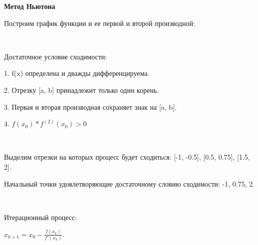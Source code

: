 \documentclass[]{article}
\begin{document}
\newpage
\begin{center}
	\huge\textbf{Метод Ньютона}
\end{center}

Построим график функции и ее первой и второй производной:

\begin{center}
\end{center}


~

Достаточное условие сходимости:

1. f(x) определена и дважды дифференцируема.

2. Отрезку [a, b] принадлежит только один корень.

3. Первая и вторая производная сохраняет знак на [a, b].

4. $f(x_0)*f^{(2)}(x_0) > 0$

~

Выделим отрезки на которых процесс будет сходиться: [-1, -0.5], [0.5, 0.75], [1.5, 2].

Начальный точки удовлетворяющие достаточному словию сходимости: -1, 0.75, 2.

~

Итерационный процесс:

$x_{k+1} = x_{0} - \frac{f(x_{k})}{f'(x_{k})}$.

~
\end{document}
